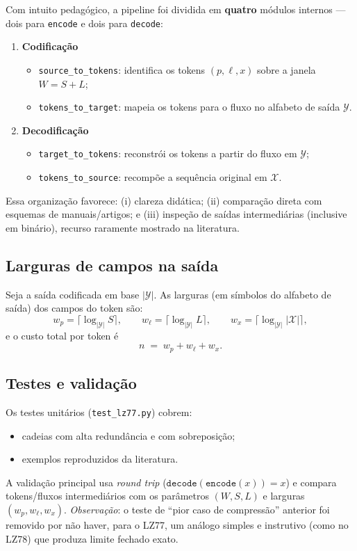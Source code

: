 Com intuito pedagógico, a pipeline foi dividida em \textbf{quatro} módulos
internos — dois para \texttt{encode} e dois para \texttt{decode}:
\begin{enumerate}
    \item \textbf{Codificação}
          \begin{itemize}
              \item \texttt{source\_to\_tokens}: identifica os tokens \((p,\ell,x)\) sobre a janela \(W=S+L\);
              \item \texttt{tokens\_to\_target}: mapeia os tokens para o fluxo no alfabeto de saída \(\mathcal{Y}\).
          \end{itemize}
    \item \textbf{Decodificação}
          \begin{itemize}
              \item \texttt{target\_to\_tokens}: reconstrói os tokens a partir do fluxo em \(\mathcal{Y}\);
              \item \texttt{tokens\_to\_source}: recompõe a sequência original em \(\mathcal{X}\).
          \end{itemize}
\end{enumerate}

Essa organização favorece: (i) clareza didática; (ii) comparação direta com
esquemas de manuais/artigos; e (iii) inspeção de saídas intermediárias
(inclusive em binário), recurso raramente mostrado na literatura.

\subsection{Larguras de campos na saída}\label{subsec:larguras}

Seja a saída codificada em base \( |\mathcal{Y}| \). As larguras (em símbolos
do alfabeto de saída) dos campos do token são:
\[
    w_p = \big\lceil \log_{|\mathcal{Y}|} S \big\rceil,\qquad
    w_\ell = \big\lceil \log_{|\mathcal{Y}|} L \big\rceil,\qquad
    w_x = \big\lceil \log_{|\mathcal{Y}|} |\mathcal{X}| \big\rceil,
\]
e o custo total por token é
\[
    n \;=\; w_p + w_\ell + w_x.
\]

\subsection{Testes e validação}\label{subsec:testes}

Os testes unitários (\texttt{test\_lz77.py}) cobrem:
\begin{itemize}
    \item cadeias com alta redundância e com sobreposição;
    \item exemplos reproduzidos da literatura.
\end{itemize}
A validação principal usa \textit{round trip} (\(\texttt{decode}(\texttt{encode}(x)) = x\)) e compara tokens/fluxos intermediários com os parâmetros \((W,S,L)\) e larguras \((w_p,w_\ell,w_x)\).
\emph{Observação}: o teste de “pior caso de compressão” anterior foi removido por não haver, para o LZ77, um análogo simples e instrutivo (como no LZ78) que produza limite fechado exato.

